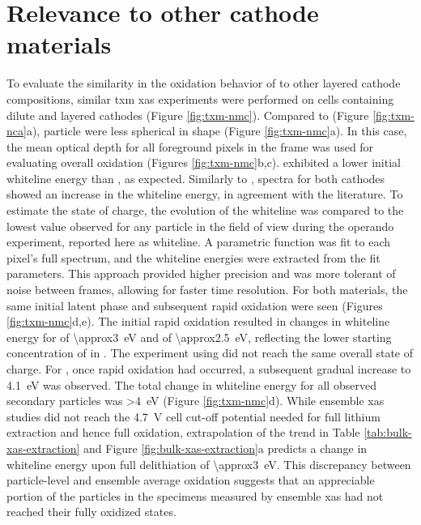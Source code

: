 \documentclass{article}
\begin{document}
\section{Relevance to other cathode materials}


To evaluate the similarity in the oxidation behavior of \nca{} to
other layered cathode compositions, similar \gls{txm} \gls{xas}
experiments were performed on cells containing dilute \nmc[333]{} and
\nmc[532]{} layered cathodes (Figure \ref{fig:txm-nmc}). Compared to
\nca{} (Figure \ref{fig:txm-nca}a), \nmc{} particle were less
spherical in shape (Figure \ref{fig:txm-nmc}a). In this case, the mean optical depth
for all foreground pixels in the frame was used for evaluating overall
oxidation (Figures \ref{fig:txm-nmc}b,c). \nmc[333]{} exhibited a lower initial whiteline energy than \nca{}, as expected\cite{deb2005,muto2009}. Similarly to \nca{}, spectra
for both \nmc{} cathodes showed an increase in the whiteline
energy, in agreement with the literature. To estimate the state of charge, the evolution of the whiteline was compared to the lowest value observed for any
particle in the field of view during the operando experiment, reported
here as \textDelta{}whiteline. A parametric function was fit to each
pixel's full spectrum, and the whiteline energies were extracted from
the fit parameters. This approach provided higher precision and was
more tolerant of noise between frames, allowing for faster time
resolution. For both \nmc{} materials, the same initial latent phase
and subsequent rapid oxidation were seen (Figures
\ref{fig:txm-nmc}d,e). The initial rapid  oxidation resulted in
changes in whiteline energy for \nmc[333]{} of
\SI{\approx3}{\electronvolt} and \nmc[532]{} of
\SI{\approx2.5}{\electronvolt}, reflecting the lower starting
concentration of  in \nmc[532]{}. The experiment using
\nmc[532]{} did not reach the same overall state of charge. For
\nmc[333]{}, once rapid oxidation had occurred, a subsequent gradual
increase to \SI{4.1}{eV} was observed. The total
change in whiteline energy for all observed secondary particles was
\SI{>4}{eV} (Figure \ref{fig:txm-nmc}d). While ensemble \gls{xas}
studies\cite{deb2005,muto2009} did not reach the \SI{4.7}{V} cell
cut-off potential needed for full lithium extraction and hence full
 oxidation, extrapolation of the trend in Table
\ref{tab:bulk-xas-extraction} and Figure
\ref{fig:bulk-xas-extraction}a predicts a change in whiteline energy
upon full delithiation of \SI{\approx3}{eV}. This discrepancy between
particle-level and ensemble average  oxidation suggests that an
appreciable portion of the particles in the specimens measured by
ensemble \gls{xas} had not reached their fully oxidized states.
\end{document}
